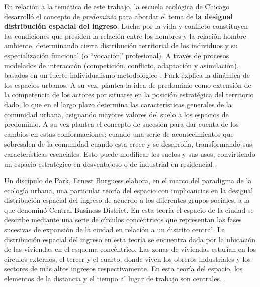 En relación a la temática de este trabajo, la escuela ecológica de Chicago desarrolló el concepto de \textit{predominio} para abordar el tema de \textbf{la desigual distribución espacial del ingreso}. Lucha por la vida y conflicto constituyen las condiciones que presiden la relación entre los hombres y la relación hombre-ambiente, determinando cierta distribución territorial de los individuos y su especialización funcional (o “vocación” profesional). A través de procesos modelados de interacción (competición, conflicto, adaptación y asimilación), basados en un fuerte individualismo metodológico \cite{gottdiener}, Park \citeyear{park} explica la dinámica de los espacios urbanos. A su vez, plantea la idea de predominio como extensión de la competencia de los actores por situarse en la posición estratégica del territorio dado, lo que en el largo plazo determina las características generales de la comunidad urbana, asignando mayores valores del suelo a los espacios de predominio. A su vez plantea el concepto de sucesión para dar cuenta de los cambios en estas conformaciones: cuando una serie de acontecimientos que sobresalen de la comunidad cuando esta crece y se desarrolla, transformando sus características esenciales. Esto puede modificar los suelos y sus usos, convirtiendo un espacio estratégico en desventajoso o de industrial en residencial \cite[p.~78]{betin}. 


Un discípulo de Park, Ernest Burguess \citeyear{burgess1928} elabora, en el marco del paradigma de la ecología urbana, una particular teoría del espacio con implicancias en la desigual distribución espacial del ingreso de acuerdo a los diferentes grupos sociales, a la que denominó Central Business District. En esta teoría el espacio de la ciudad se describe mediante una serie de círculos concéntricos que representan las fases sucesivas de expansión de la ciudad en relación a un distrito central. La distribución espacial del ingreso en esta teoría se encuentra dada por la ubicación de las viviendas en el esquema concéntrico. Las zonas de viviendas estarían en los círculos externos, el tercer y el cuarto, donde viven los obreros industriales y los sectores de más altos ingresos respectivamente. En esta teoría del espacio, los elementos de la distancia y el tiempo al lugar de trabajo son centrales. \cite{burgess1928,betin}. 

